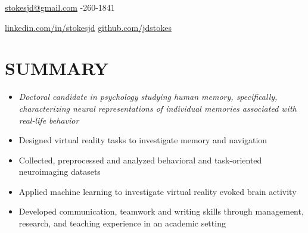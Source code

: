 \documentclass[line,margin,10pt]{res}
\begin{document}

\begin{resume}
\hoffset\centerline 
{\hyperref[stokesjd@gmail.com]{stokesjd@gmail.com} \quad \quad \quad \quad  \quad \quad \quad \quad \quad \quad \quad \quad \quad \quad \quad \quad \quad \quad \quad \quad\quad \quad \quad \quad \quad \quad \quad \quad \quad \quad \quad  \quad \quad \quad \quad {}-260-1841}
\hoffset\centerline 
{\hspace{0.00cm} \hyperref[linkedin.com/in/stokesjd]{linkedin.com/in/stokesjd} \quad \quad \quad \quad \quad \quad \quad \quad \quad \quad \quad\quad \quad \quad \quad  \quad \quad \quad \quad \quad \quad \quad \quad \quad  \quad \quad \quad  \quad \quad \quad   \quad \hyperref[github.com/jdstokes]{github.com/jdstokes}}


\section{SUMMARY} 
\begin{itemize} \itemsep -2pt
\item  []{\sl Doctoral candidate in psychology studying human memory, specifically, characterizing neural representations of individual memories associated with real-life behavior}\\
\item Designed virtual reality tasks to investigate memory and navigation
\item Collected, preprocessed and analyzed behavioral and task-oriented neuroimaging datasets
\item Applied machine learning to investigate virtual reality evoked brain activity
\item Developed communication, teamwork and writing skills through management, research, and teaching experience in an academic setting
\end{itemize}


\end{resume}
\end{document}

